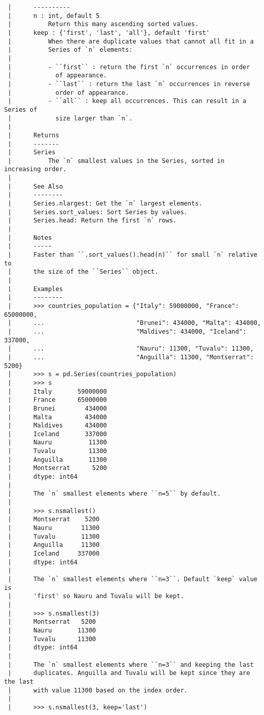 \documentclass[
  letterpaper,
  DIV=11,
  numbers=noendperiod]{scrreprt}
\begin{document}
\begin{verbatim}
 |      ----------
 |      n : int, default 5
 |          Return this many ascending sorted values.
 |      keep : {'first', 'last', 'all'}, default 'first'
 |          When there are duplicate values that cannot all fit in a
 |          Series of `n` elements:
 |      
 |          - ``first`` : return the first `n` occurrences in order
 |            of appearance.
 |          - ``last`` : return the last `n` occurrences in reverse
 |            order of appearance.
 |          - ``all`` : keep all occurrences. This can result in a Series of
 |            size larger than `n`.
 |      
 |      Returns
 |      -------
 |      Series
 |          The `n` smallest values in the Series, sorted in increasing order.
 |      
 |      See Also
 |      --------
 |      Series.nlargest: Get the `n` largest elements.
 |      Series.sort_values: Sort Series by values.
 |      Series.head: Return the first `n` rows.
 |      
 |      Notes
 |      -----
 |      Faster than ``.sort_values().head(n)`` for small `n` relative to
 |      the size of the ``Series`` object.
 |      
 |      Examples
 |      --------
 |      >>> countries_population = {"Italy": 59000000, "France": 65000000,
 |      ...                         "Brunei": 434000, "Malta": 434000,
 |      ...                         "Maldives": 434000, "Iceland": 337000,
 |      ...                         "Nauru": 11300, "Tuvalu": 11300,
 |      ...                         "Anguilla": 11300, "Montserrat": 5200}
 |      >>> s = pd.Series(countries_population)
 |      >>> s
 |      Italy       59000000
 |      France      65000000
 |      Brunei        434000
 |      Malta         434000
 |      Maldives      434000
 |      Iceland       337000
 |      Nauru          11300
 |      Tuvalu         11300
 |      Anguilla       11300
 |      Montserrat      5200
 |      dtype: int64
 |      
 |      The `n` smallest elements where ``n=5`` by default.
 |      
 |      >>> s.nsmallest()
 |      Montserrat    5200
 |      Nauru        11300
 |      Tuvalu       11300
 |      Anguilla     11300
 |      Iceland     337000
 |      dtype: int64
 |      
 |      The `n` smallest elements where ``n=3``. Default `keep` value is
 |      'first' so Nauru and Tuvalu will be kept.
 |      
 |      >>> s.nsmallest(3)
 |      Montserrat   5200
 |      Nauru       11300
 |      Tuvalu      11300
 |      dtype: int64
 |      
 |      The `n` smallest elements where ``n=3`` and keeping the last
 |      duplicates. Anguilla and Tuvalu will be kept since they are the last
 |      with value 11300 based on the index order.
 |      
 |      >>> s.nsmallest(3, keep='last')

\end{verbatim}
\end{document}
